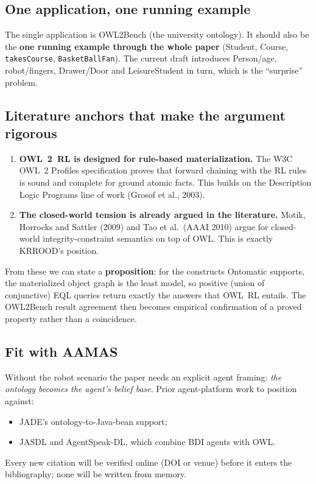 \documentclass[11pt]{article}
\newcommand{\code}[1]{\texttt{#1}}
\begin{document}
\subsection{One application, one running example}
The single application is OWL2Bench (the university ontology). It should also be the \textbf{one running example through the whole paper} (Student, Course, \code{takesCourse}, \code{BasketBallFan}). The current draft introduces Person/age, robot/fingers, Drawer/Door and LeisureStudent in turn, which is the ``surprise'' problem.

\subsection{Literature anchors that make the argument rigorous}
\begin{enumerate}
  \item \textbf{OWL~2~RL is designed for rule-based materialization.} The W3C OWL~2 Profiles specification proves that forward chaining with the RL rules is sound and complete for ground atomic facts. This builds on the Description Logic Programs line of work (Grosof et al., 2003).
  \item \textbf{The closed-world tension is already argued in the literature.} Motik, Horrocks and Sattler (2009) and Tao et al.\ (AAAI 2010) argue for closed-world integrity-constraint semantics on top of OWL. This is exactly KRROOD's position.
\end{enumerate}

From these we can state a \textbf{proposition}: for the constructs Ontomatic supports, the materialized object graph is the least model, so positive (union of conjunctive) EQL queries return exactly the answers that OWL~RL entails. The OWL2Bench result agreement then becomes empirical confirmation of a proved property rather than a coincidence.

\subsection{Fit with AAMAS}
Without the robot scenario the paper needs an explicit agent framing: \emph{the ontology becomes the agent's belief base}. Prior agent-platform work to position against:
\begin{itemize}
  \item JADE's ontology-to-Java-bean support;
  \item JASDL and AgentSpeak-DL, which combine BDI agents with OWL.
\end{itemize}
Every new citation will be verified online (DOI or venue) before it enters the bibliography; none will be written from memory.
\end{document}

